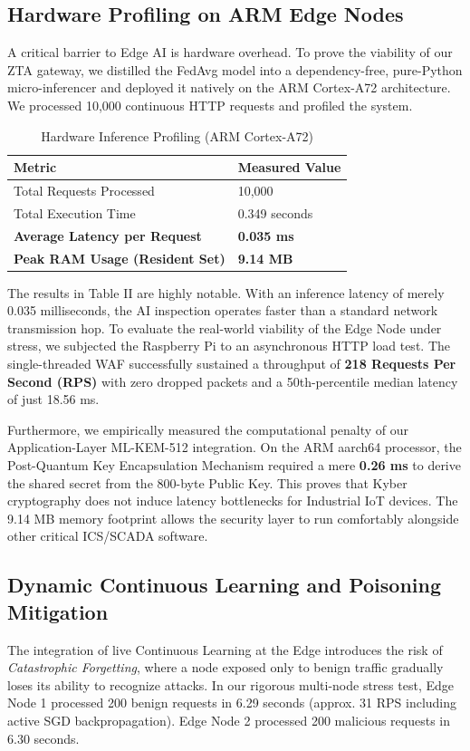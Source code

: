 \documentclass[conference]{IEEEtran}
\begin{document}
\subsection{Hardware Profiling on ARM Edge Nodes}
A critical barrier to Edge AI is hardware overhead. To prove the viability of our ZTA gateway, we distilled the FedAvg model into a dependency-free, pure-Python micro-inferencer and deployed it natively on the ARM Cortex-A72 architecture. We processed 10,000 continuous HTTP requests and profiled the system.

\begin{table}[htbp]
\centering
\caption{Hardware Inference Profiling (ARM Cortex-A72)}
\begin{tabular}{@{}ll@{}}
\toprule
\textbf{Metric} & \textbf{Measured Value} \\ \midrule
Total Requests Processed & 10,000 \\
Total Execution Time & 0.349 seconds \\
\textbf{Average Latency per Request} & \textbf{0.035 ms} \\
\textbf{Peak RAM Usage (Resident Set)} & \textbf{9.14 MB} \\ \bottomrule
\end{tabular}
\end{table}

The results in Table II are highly notable. With an inference latency of merely 0.035 milliseconds, the AI inspection operates faster than a standard network transmission hop. To evaluate the real-world viability of the Edge Node under stress, we subjected the Raspberry Pi to an asynchronous HTTP load test. The single-threaded WAF successfully sustained a throughput of \textbf{218 Requests Per Second (RPS)} with zero dropped packets and a 50th-percentile median latency of just 18.56 ms. 

Furthermore, we empirically measured the computational penalty of our Application-Layer ML-KEM-512 integration. On the ARM aarch64 processor, the Post-Quantum Key Encapsulation Mechanism required a mere \textbf{0.26 ms} to derive the shared secret from the 800-byte Public Key. This proves that Kyber cryptography does not induce latency bottlenecks for Industrial IoT devices. The 9.14 MB memory footprint allows the security layer to run comfortably alongside other critical ICS/SCADA software.

\subsection{Dynamic Continuous Learning and Poisoning Mitigation}
The integration of live Continuous Learning at the Edge introduces the risk of \textit{Catastrophic Forgetting}, where a node exposed only to benign traffic gradually loses its ability to recognize attacks. In our rigorous multi-node stress test, Edge Node 1 processed 200 benign requests in 6.29 seconds (approx. 31 RPS including active SGD backpropagation). Edge Node 2 processed 200 malicious requests in 6.30 seconds.
\end{document}

